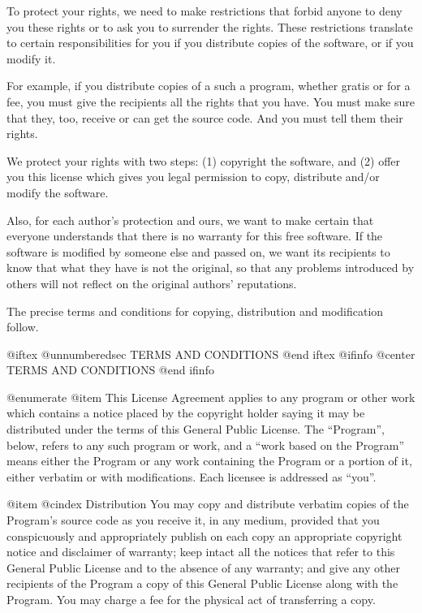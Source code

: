   To protect your rights, we need to make restrictions that forbid
anyone to deny you these rights or to ask you to surrender the rights.
These restrictions translate to certain responsibilities for you if you
distribute copies of the software, or if you modify it.

  For example, if you distribute copies of a such a program, whether
gratis or for a fee, you must give the recipients all the rights that
you have.  You must make sure that they, too, receive or can get the
source code.  And you must tell them their rights.

  We protect your rights with two steps: (1) copyright the software, and
(2) offer you this license which gives you legal permission to copy,
distribute and/or modify the software.

  Also, for each author's protection and ours, we want to make certain
that everyone understands that there is no warranty for this free
software.  If the software is modified by someone else and passed on, we
want its recipients to know that what they have is not the original, so
that any problems introduced by others will not reflect on the original
authors' reputations.

  The precise terms and conditions for copying, distribution and
modification follow.

@iftex
@unnumberedsec TERMS AND CONDITIONS
@end iftex
@ifinfo
@center TERMS AND CONDITIONS
@end ifinfo

@enumerate
@item
This License Agreement applies to any program or other work which
contains a notice placed by the copyright holder saying it may be
distributed under the terms of this General Public License.  The
``Program'', below, refers to any such program or work, and a ``work based
on the Program'' means either the Program or any work containing the
Program or a portion of it, either verbatim or with modifications.  Each
licensee is addressed as ``you''.

@item
@cindex Distribution
You may copy and distribute verbatim copies of the Program's source
code as you receive it, in any medium, provided that you conspicuously and
appropriately publish on each copy an appropriate copyright notice and
disclaimer of warranty; keep intact all the notices that refer to this
General Public License and to the absence of any warranty; and give any
other recipients of the Program a copy of this General Public License
along with the Program.  You may charge a fee for the physical act of
transferring a copy.

